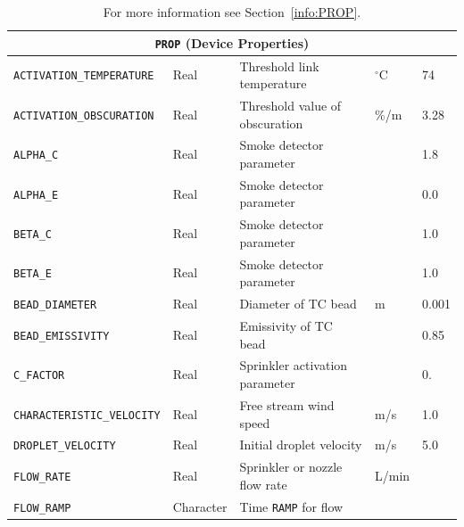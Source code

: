 \documentclass[11pt]{book}
\newcommand{\ct}{\tt\small}
\begin{document}
\hspace{0.5in}

\begin{table}[H]
\caption{For more information see Section~\ref{info:PROP}.}\label{tbl:PROP}
\noindent
\begin{tabular*}{\textwidth}{@{\extracolsep{\fill}}|l|l|l|l|l|}
\hline
\multicolumn{5}{|c|}{{\ct PROP} (Device Properties)} \\ \hline \hline
{\ct ACTIVATION\_TEMPERATURE}           & Real          & Threshold link temperature       & $^\circ$C             & 74        \\ \hline
{\ct ACTIVATION\_OBSCURATION}           & Real          & Threshold value of obscuration   & \%/m                  & 3.28      \\ \hline
{\ct ALPHA\_C}                          & Real          & Smoke detector parameter         &                       & 1.8       \\ \hline
{\ct ALPHA\_E}                          & Real          & Smoke detector parameter         &                       & 0.0       \\ \hline
{\ct BETA\_C}                           & Real          & Smoke detector parameter         &                       & 1.0       \\ \hline
{\ct BETA\_E}                           & Real          & Smoke detector parameter         &                       & 1.0       \\ \hline
{\ct BEAD\_DIAMETER}                    & Real          & Diameter of TC bead              & m                     & 0.001     \\ \hline
{\ct BEAD\_EMISSIVITY}                  & Real          & Emissivity of TC bead            &                       & 0.85      \\ \hline
{\ct C\_FACTOR}                         & Real          & Sprinkler activation parameter   &                       & 0.        \\ \hline
{\ct CHARACTERISTIC\_VELOCITY}          & Real          & Free stream wind speed           & m/s                   & 1.0       \\ \hline
{\ct DROPLET\_VELOCITY}                 & Real          & Initial droplet velocity         & m/s                   & 5.0       \\ \hline
{\ct FLOW\_RATE}                        & Real          & Sprinkler or nozzle flow rate    & L/min                 &           \\ \hline
{\ct FLOW\_RAMP}                        & Character     & Time {\ct RAMP} for flow         &                       &           \\ \hline

\end{tabular*}
\end{table}
\end{document}
